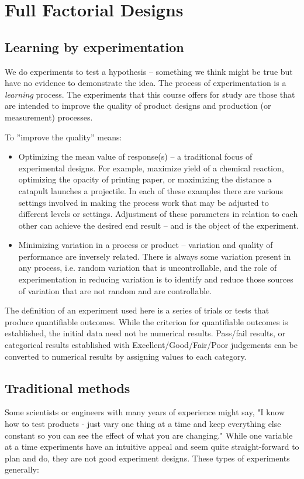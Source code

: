 \chapter{Full Factorial Designs}

\section{Learning by experimentation}
We do experiments to test a hypothesis -- something we think might be true but have no evidence to demonstrate the idea.  The process of experimentation is a \textit{learning} process.  The experiments that this course offers for study are those that are intended to improve the quality of product designs and production (or measurement) processes.

To ''improve the quality'' means:

\begin{itemize}
\item Optimizing the mean value of response(s) -- a traditional focus of experimental designs.  For example, maximize yield of a chemical reaction, optimizing the opacity of printing paper, or maximizing the distance a catapult launches a projectile. In each of these examples there are various settings involved in making the process work that may be adjusted to different levels or settings.  Adjustment of these parameters in relation to each other can achieve the desired end result -- and is the object of the experiment.

\item Minimizing variation in a process or product -- variation and quality of performance are inversely related. There is always some variation present in any process, i.e. random variation that is uncontrollable, and the role of experimentation in reducing variation is to identify and reduce those sources of variation that are not random and are controllable.
\end{itemize}

The definition of an experiment used here is a series of trials or tests that produce quantifiable outcomes. While the criterion for quantifiable outcomes is established, the initial data need not be numerical results. Pass/fail results, or categorical results established with Excellent/Good/Fair/Poor judgements can be converted to numerical results by assigning values to each category.

\section{Traditional methods}
Some scientists or engineers with many years of experience might say, "I know how to test products - just vary one thing at a time and keep everything else constant so you can see the effect of what you are changing."  While one variable at a time experiments have an intuitive appeal and seem quite straight-forward to plan and do, they are not good experiment designs.  These types of experiments generally:

